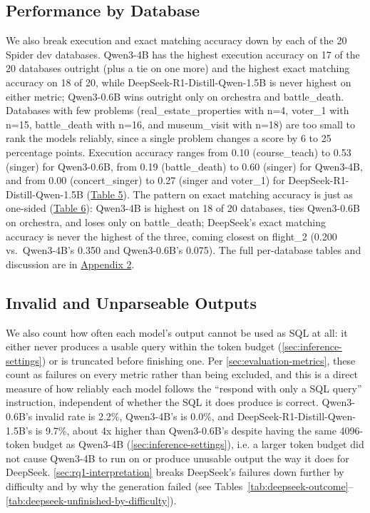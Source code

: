 \subsection{Performance by Database}
\label{sec:by-database}

We also break execution and exact matching accuracy down by each of the 20 Spider dev databases. Qwen3-4B has the highest execution accuracy on 17 of the 20 databases outright (plus a tie on one more) and the highest exact matching accuracy on 18 of 20, while DeepSeek-R1-Distill-Qwen-1.5B is never highest on either metric; Qwen3-0.6B wins outright only on orchestra and battle\_death. Databases with few problems (real\_estate\_properties with n=4, voter\_1 with n=15, battle\_death with n=16, and museum\_visit with n=18) are too small to rank the models reliably, since a single problem changes a score by 6 to 25 percentage points. Execution accuracy ranges from 0.10 (course\_teach) to 0.53 (singer) for Qwen3-0.6B, from 0.19 (battle\_death) to 0.60 (singer) for Qwen3-4B, and from 0.00 (concert\_singer) to 0.27 (singer and voter\_1) for DeepSeek-R1-Distill-Qwen-1.5B (\hyperref[tab:db-execution]{Table 5}). The pattern on exact matching accuracy is just as one-sided (\hyperref[tab:db-exact]{Table 6}): Qwen3-4B is highest on 18 of 20 databases, ties Qwen3-0.6B on orchestra, and loses only on battle\_death; DeepSeek's exact matching accuracy is never the highest of the three, coming closest on flight\_2 (0.200 vs.\ Qwen3-4B's 0.350 and Qwen3-0.6B's 0.075). The full per-database tables and discussion are in \hyperref[sec:appendix2]{Appendix 2}.

\subsection{Invalid and Unparseable Outputs}
\label{sec:invalid-outputs}

We also count how often each model's output cannot be used as SQL at all: it either never produces a usable query within the token budget (\ref{sec:inference-settings}) or is truncated before finishing one. Per \ref{sec:evaluation-metrics}, these count as failures on every metric rather than being excluded, and this is a direct measure of how reliably each model follows the ``respond with only a SQL query'' instruction, independent of whether the SQL it does produce is correct. Qwen3-0.6B's invalid rate is 2.2\%, Qwen3-4B's is 0.0\%, and DeepSeek-R1-Distill-Qwen-1.5B's is 9.7\%, about 4x higher than Qwen3-0.6B's despite having the same 4096-token budget as Qwen3-4B (\ref{sec:inference-settings}), i.e. a larger token budget did not cause Qwen3-4B to run on or produce unusable output the way it does for DeepSeek. \ref{sec:rq1-interpretation} breaks DeepSeek's failures down further by difficulty and by why the generation failed (see Tables~\ref{tab:deepseek-outcome}--\ref{tab:deepseek-unfinished-by-difficulty}).


